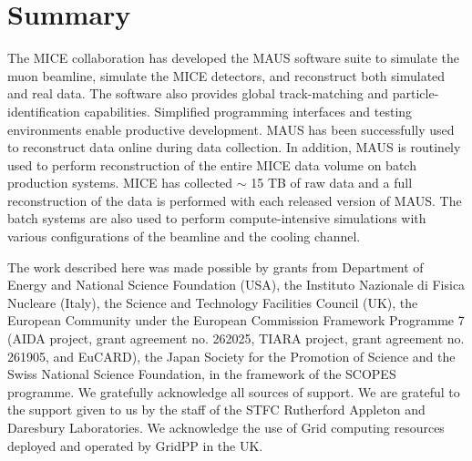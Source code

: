 \documentclass[11pt,a4paper]{article}
\begin{document}
 \section{Summary}

The MICE collaboration has developed the MAUS software suite to simulate the muon beamline, simulate the MICE detectors, and reconstruct both simulated and real data. The software also provides global track-matching and particle-identification capabilities. Simplified programming interfaces and testing environments enable productive development. MAUS has been successfully used to reconstruct data online during data collection. In addition, MAUS is routinely used to perform reconstruction of the entire MICE data volume on batch production systems. MICE has collected $\sim$ 15 TB of raw data and a full reconstruction of the data is performed with each released version of MAUS. The batch systems are also used to perform compute-intensive simulations with various configurations of the beamline and the cooling channel. 

\acknowledgments

The work described here was made possible by grants from Department of Energy and National Science Foundation
(USA), the Instituto Nazionale di Fisica Nucleare (Italy), the Science and Technology Facilities Council
(UK), the European Community under the European Commission Framework Programme 7 (AIDA project,
grant agreement no. 262025, TIARA project, grant agreement no. 261905, and EuCARD), the Japan Society
for the Promotion of Science and the Swiss National Science Foundation, in the framework of the SCOPES
programme. We gratefully acknowledge all sources of support. We are grateful to the support given to us
by the staff of the STFC Rutherford Appleton and Daresbury Laboratories. We acknowledge the use of Grid
computing resources deployed and operated by GridPP \cite{GridPP} in the UK.


                                                                           

\end{document}
